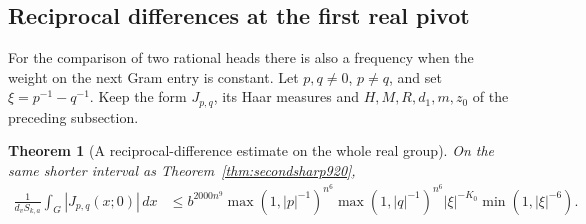 \documentclass[a4paper,11pt]{article}
\newtheorem{theorem}[proposition]{Theorem}
\theoremstyle{definition}
\theoremstyle{remark}
\numberwithin{equation}{section}
\begin{document}
\subsection{Reciprocal differences at the first real pivot}
\label{sec:firstmismatch921}

For the comparison of two rational heads there is also a
frequency when the weight on the next Gram entry is constant.
Let \(p,q\ne0\), \(p\ne q\), and set
\(\xi=p^{-1}-q^{-1}\). Keep the form \(J_{p,q}\), its Haar
measures and \(H,M,R,d_1,m,z_0\) of the preceding subsection.

\begin{theorem}[A reciprocal-difference estimate on the whole real group]
\leavevmode\label{thm:firstmismatch921}
On the same shorter interval as Theorem~\ref{thm:secondsharp920},
\begin{align}
 \frac1{d_v S_{k,a}}\int_G |J_{p,q}(x;0)|\,dx
 &\le b^{2000n^9}
 \max(1,|p|^{-1})^{n^6}\max(1,|q|^{-1})^{n^6}
 |\xi|^{-K_0}\min(1,|\xi|^{-6}).
 \label{eq:firstmismatch921}
\end{align}
\end{theorem}
\end{document}
